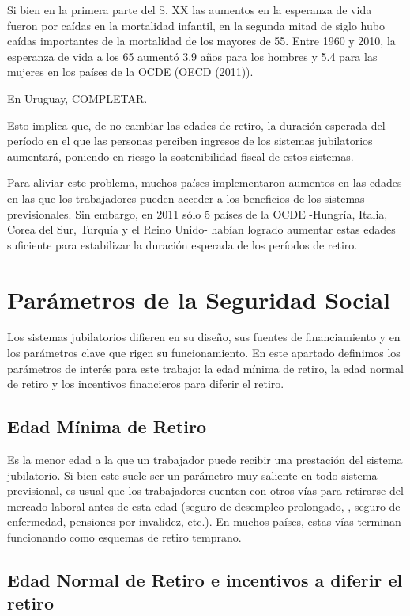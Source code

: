 \documentclass[]{article}
\begin{document}
Si bien en la primera parte del S. XX las aumentos en la esperanza de
vida fueron por caídas en la mortalidad infantil, en la segunda mitad de
siglo hubo caídas importantes de la mortalidad de los mayores de 55.
Entre 1960 y 2010, la esperanza de vida a los 65 aumentó 3.9 años para
los hombres y 5.4 para las mujeres en los países de la OCDE (OECD
(2011)).

En Uruguay, COMPLETAR.

Esto implica que, de no cambiar las edades de retiro, la duración
esperada del período en el que las personas perciben ingresos de los
sistemas jubilatorios aumentará, poniendo en riesgo la sostenibilidad
fiscal de estos sistemas.

Para aliviar este problema, muchos países implementaron aumentos en las
edades en las que los trabajadores pueden acceder a los beneficios de
los sistemas previsionales. Sin embargo, en 2011 sólo 5 países de la
OCDE -Hungría, Italia, Corea del Sur, Turquía y el Reino Unido- habían
logrado aumentar estas edades suficiente para estabilizar la duración
esperada de los períodos de retiro.

\section{Parámetros de la Seguridad
Social}\label{parametros-de-la-seguridad-social}

Los sistemas jubilatorios difieren en su diseño, sus fuentes de
financiamiento y en los parámetros clave que rigen su funcionamiento. En
este apartado definimos los parámetros de interés para este trabajo: la
edad mínima de retiro, la edad normal de retiro y los incentivos
financieros para diferir el retiro.

\subsection{Edad Mínima de Retiro}\label{edad-minima-de-retiro}

Es la menor edad a la que un trabajador puede recibir una prestación del
sistema jubilatorio. Si bien este suele ser un parámetro muy saliente en
todo sistema previsional, es usual que los trabajadores cuenten con
otros vías para retirarse del mercado laboral antes de esta edad (seguro
de desempleo prolongado, , seguro de enfermedad, pensiones por
invalidez, etc.). En muchos países, estas vías terminan funcionando como
esquemas de retiro temprano.

\subsection{Edad Normal de Retiro e incentivos a diferir el
retiro}\label{edad-normal-de-retiro-e-incentivos-a-diferir-el-retiro}
\end{document}
